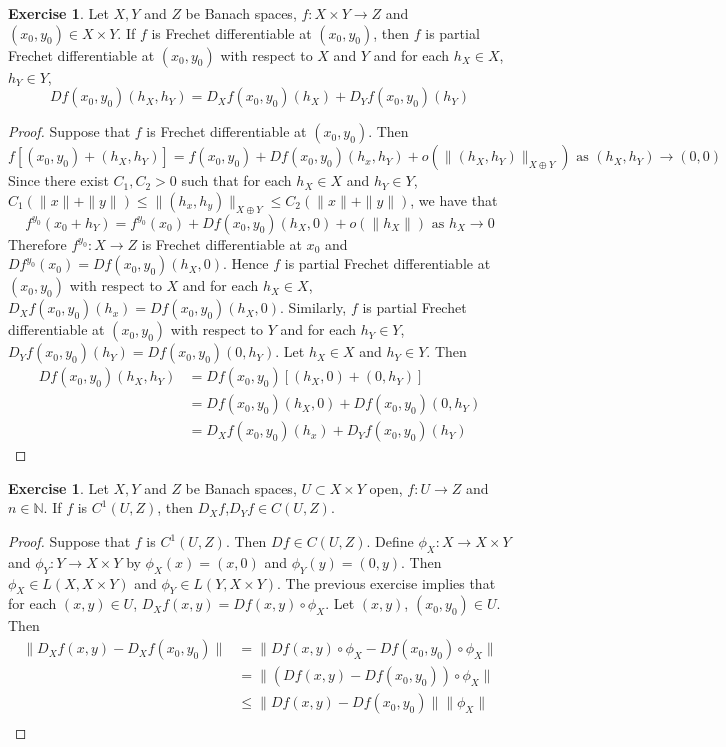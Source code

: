 \documentclass[12pt]{amsart}
\theoremstyle{definition}
\newtheorem{ex}[definition]{Exercise}
\newcommand{\N}{\mathbb{N}}
\DeclareMathOperator*{\0}{\mbf{0}}
\DeclareMathOperator*{\1}{\mbf{1}}
\begin{document}
	\begin{ex}
		Let $X, Y$ and $Z$ be Banach spaces, $f: X \times Y \rightarrow Z$ and $(x_0, y_0) \in X \times Y$. If $f$ is Frechet differentiable at $(x_0, y_0)$, then $f$ is partial Frechet differentiable at $(x_0, y_0)$ with respect to $X$ and $Y$ and for each $h_X \in X$, $h_Y \in Y$,  
		$$Df(x_0, y_0)(h_X, h_Y) = D_Xf(x_0, y_0) (h_X) + D_Yf(x_0, y_0) (h_Y)$$
	\end{ex}

	\begin{proof}
		Suppose that $f$ is Frechet differentiable at $(x_0, y_0)$. Then 
		$$f[(x_0,y_0) + (h_X, h_Y)] = f(x_0, y_0) + Df(x_0, y_0)(h_x, h_Y) + o(\|(h_X, h_Y)\|_{X \oplus Y}) \text{ as } (h_X, h_Y) \rightarrow (0,0)$$ Since there exist $C_1, C_2 > 0$ such that for each $h_X \in X$ and $h_Y \in Y$, $C_1(\|x\| + \|y\|) \leq \|(h_x, h_y)\|_{X \oplus Y} \leq C_2(\|x\| + \|y\|)$, we have that 
		$$f^{y_0}(x_0 + h_Y) = f^{y_0}(x_0) + Df(x_0, y_0)(h_X, 0) + o(\|h_X\|) \text{ as } h_X \rightarrow 0$$
		Therefore $f^{y_0}:X \rightarrow Z$ is Frechet differentiable at $x_0$ and $Df^{y_0}(x_0) = Df(x_0, y_0)(h_X, 0)$. Hence $f$ is partial Frechet differentiable at $(x_0, y_0)$ with respect to $X$ and for each $h_X \in X$, $D_Xf(x_0, y_0)(h_x) = Df(x_0, y_0)(h_X, 0)$. Similarly, $f$ is partial Frechet differentiable at $(x_0, y_0)$ with respect to $Y$ and for each $h_Y \in Y$, $D_Yf(x_0, y_0)(h_Y) = Df(x_0, y_0)(0, h_Y)$. Let $h_X \in X$ and $h_Y \in Y$. Then
		\begin{align*}
			Df(x_0, y_0)(h_X, h_Y) 
			& = Df(x_0, y_0)[(h_X, 0) + (0, h_Y)] \\
			& = Df(x_0, y_0)(h_X, 0) + Df(x_0, y_0)(0, h_Y) \\
			& = D_Xf(x_0, y_0)(h_x) +  D_Yf(x_0, y_0)(h_Y)
		\end{align*}
	\end{proof}

	\begin{ex}
		Let $X, Y$ and $Z$ be Banach spaces, $U \subset X \times Y$ open, $f: U \rightarrow Z$ and $n \in \N$. If $f$ is $C^1(U, Z)$, then $D_Xf$,$D_Yf \in C(U, Z)$.
	\end{ex}

	\begin{proof}
		Suppose that $f$ is $C^1(U, Z)$. Then $Df \in C(U, Z)$. Define $\phi_X:X \rightarrow X \times Y$ and $\phi_Y:Y \rightarrow X \times Y$ by $\phi_X(x) = (x, 0)$ and $\phi_Y(y) = (0, y)$. Then $\phi_X \in L(X, X \times Y)$ and $\phi_Y \in L(Y, X \times Y)$. The previous exercise implies that for each $(x,y) \in U$, $D_Xf(x,y) = Df(x, y) \circ \phi_X $. Let $(x,y)$, $(x_0, y_0) \in U$. Then 
		\begin{align*}
			\|D_Xf(x,y) - D_Xf(x_0, y_0)\|
			& = \|Df(x, y) \circ \phi_X - Df(x_0, y_0) \circ \phi_X\| \\
			& = \|(Df(x, y) - Df(x_0, y_0)) \circ \phi_X\| \\
			& \leq \|Df(x, y) - Df(x_0, y_0) \| \|\phi_X\| \\
		\end{align*}
	\end{proof}
	
\end{document}
